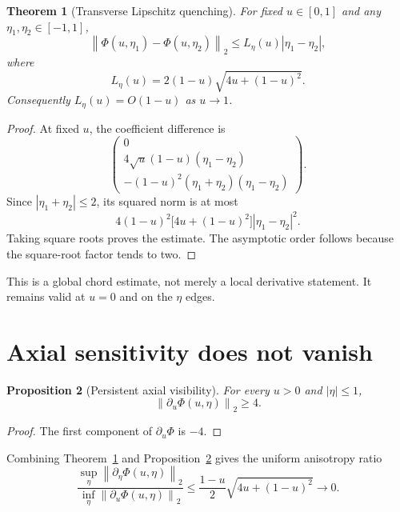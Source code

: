 \documentclass[12pt]{article}
\newtheorem{theorem}{Theorem}[section]\newtheorem{proposition}[theorem]{Proposition}
\theoremstyle{remark}\newtheorem{remark}[theorem]{Remark}
\newcommand{\norm}[1]{\left\lVert#1\right\rVert}
\begin{document}
\begin{theorem}[Transverse Lipschitz quenching]\label{thm:quench}
For fixed $u\in[0,1]$ and any $\eta_1,\eta_2\in[-1,1]$,
\begin{equation}\label{eq:lipschitz}
 \norm{\Phi(u,\eta_1)-\Phi(u,\eta_2)}_2
 \le L_\eta(u)|\eta_1-\eta_2|,
\end{equation}
where
\begin{equation}\label{eq:L}
 \boxed{L_\eta(u)=2(1-u)\sqrt{4u+(1-u)^2}.}
\end{equation}
Consequently $L_\eta(u)=O(1-u)$ as $u\to1$.
\end{theorem}
\begin{proof}
At fixed $u$, the coefficient difference is
\begin{equation}
 \begin{pmatrix}
 0\\
 4\sqrt u(1-u)(\eta_1-\eta_2)\\
 -(1-u)^2(\eta_1+\eta_2)(\eta_1-\eta_2)
 \end{pmatrix}.
\end{equation}
Since $|\eta_1+\eta_2|\le2$, its squared norm is at most
\begin{equation}
 4(1-u)^2\bigl[4u+(1-u)^2\bigr]|\eta_1-\eta_2|^2.
\end{equation}
Taking square roots proves the estimate.  The asymptotic order follows
because the square-root factor tends to two.
\end{proof}

This is a global chord estimate, not merely a local derivative statement.
It remains valid at $u=0$ and on the $\eta$ edges.

\section{Axial sensitivity does not vanish}

\begin{proposition}[Persistent axial visibility]\label{prop:axial}
For every $u>0$ and $|\eta|\le1$,
\begin{equation}\label{eq:axiallower}
 \norm{\partial_u\Phi(u,\eta)}_2\ge4.
\end{equation}
\end{proposition}
\begin{proof}
The first component of $\partial_u\Phi$ is $-4$.
\end{proof}

Combining Theorem~\ref{thm:quench} and
Proposition~\ref{prop:axial} gives the uniform anisotropy ratio
\begin{equation}\label{eq:ratio}
 \frac{\sup_{\eta}\norm{\partial_\eta\Phi(u,\eta)}_2}
      {\inf_{\eta}\norm{\partial_u\Phi(u,\eta)}_2}
 \le \frac{1-u}{2}\sqrt{4u+(1-u)^2}\longrightarrow0.
\end{equation}
\end{document}
